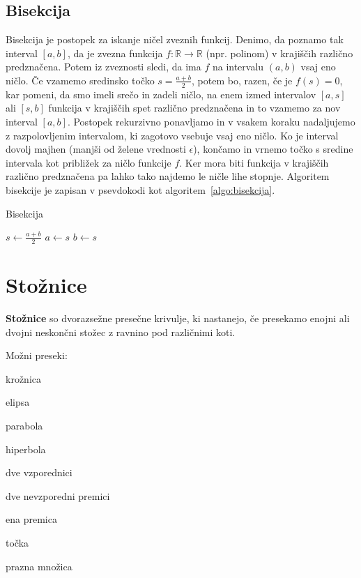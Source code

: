 \documentclass[a4paper,oneside,12pt,fleqn]{article}
\def\R{\ensuremath{\mathbb R}}
\numberwithin{equation}{section}
\newenvironment{itemize*}%
{
\vspace{-12pt}%
\begin{itemize}%
\setlength{\itemsep}{0pt}%
\setlength{\parskip}{2pt}}%
{\end{itemize}}
\begin{document}
\subsection{Bisekcija}
\label{sec:pol:bisekcija}
Bisekcija je postopek za iskanje ničel zveznih funkcij. Denimo, da poznamo tak interval $[a, b]$,
da je zvezna funkcija $f\!: \R \rightarrow \R$ (npr. polinom) v krajiščih različno predznačena.
Potem iz zveznosti sledi, da ima $f$ na intervalu $(a, b)$ vsaj eno ničlo. Če vzamemo sredinsko 
točko $s = \frac{a + b}{2}$, potem bo, razen, če je $f(s) = 0$, kar pomeni, da smo imeli srečo in 
zadeli ničlo, na enem izmed intervalov $[a, s]$ ali $[s, b]$ funkcija v krajiščih spet različno 
predznačena in to vzamemo za nov interval $[a, b]$. Postopek rekurzivno ponavljamo in v vsakem 
koraku nadaljujemo z razpolovljenim intervalom, ki zagotovo vsebuje vsaj eno ničlo. Ko je interval
dovolj majhen (manjši od želene vrednosti $\epsilon$), končamo in vrnemo točko s sredine intervala
kot približek za ničlo funkcije $f$. Ker mora biti funkcija v krajiščih različno
predznačena pa lahko tako najdemo le ničle lihe stopnje.
Algoritem bisekcije je zapisan v psevdokodi kot algoritem~\ref{algo:bisekcija}.

\begin{algorithm}[h!]
  \caption{Bisekcija}\label{algo:bisekcija}
  \begin{algorithmic}[1]
        \State $s \gets \frac{a+b}{2}$
          \State $a \gets s$
        \Else
          \State $b \gets s$
        \EndIf
    \EndWhile
  \end{algorithmic}
\end{algorithm}

\section{Stožnice}
\label{sec:stoz}
\textbf{Stožnice} so dvorazsežne presečne krivulje, ki nastanejo, če presekamo enojni ali dvojni
neskončni stožec z ravnino pod različnimi koti.

Možni preseki:
\begin{itemize*}
  \item krožnica
  \item elipsa
  \item parabola
  \item hiperbola
  \item dve vzporednici
  \item dve nevzporedni premici
  \item ena premica
  \item točka
  \item prazna množica
\end{itemize*}
\end{document}
